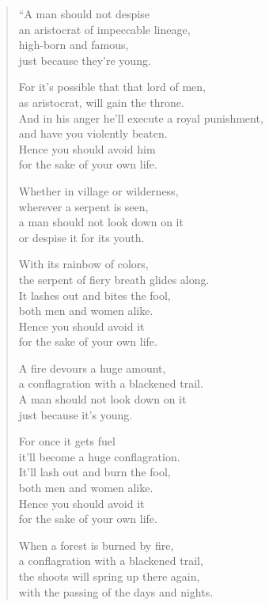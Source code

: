 \documentclass[12pt,openany]{book}%
\begin{document}
\begin{verse}%
“A man should not despise \\
an aristocrat of impeccable lineage, \\
high-born and famous, \\
just because they’re young. 

For it’s possible that that lord of men, \\
as aristocrat, will gain the throne. \\
And in his anger he’ll execute a royal punishment, \\
and have you violently beaten. \\
Hence you should avoid him \\
for the sake of your own life. 

Whether in village or wilderness, \\
wherever a serpent is seen, \\
a man should not look down on it \\
or despise it for its youth. 

With its rainbow of colors, \\
the serpent of fiery breath glides along. \\
It lashes out and bites the fool, \\
both men and women alike. \\
Hence you should avoid it \\
for the sake of your own life. 

A fire devours a huge amount, \\
a conflagration with a blackened trail. \\
A man should not look down on it \\
just because it’s young. 

For once it gets fuel \\
it’ll become a huge conflagration. \\
It’ll lash out and burn the fool, \\
both men and women alike. \\
Hence you should avoid it \\
for the sake of your own life. 

When a forest is burned by fire, \\
a conflagration with a blackened trail, \\
the shoots will spring up there again, \\
with the passing of the days and nights. 


\end{verse}
\end{document}
